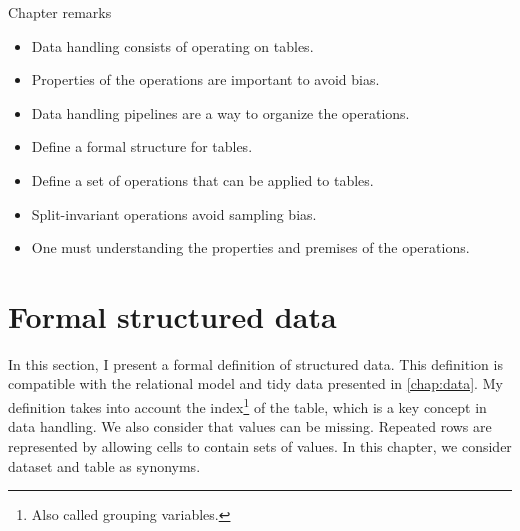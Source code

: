 \begin{mainbox}{Chapter remarks}


  \startcontents[chapters]
  \vspace{1em}


  \begin{itemize}
    \itemsep0em
    \item Data handling consists of operating on tables.
    \item Properties of the operations are important to avoid bias.
    \item Data handling pipelines are a way to organize the operations.
  \end{itemize}


  \begin{itemize}
    \itemsep0em
    \item Define a formal structure for tables.
    \item Define a set of operations that can be applied to tables.
  \end{itemize}


  \begin{itemize}
    \itemsep0em
    \item Split-invariant operations avoid sampling bias.
    \item One must understanding the properties and premises of the operations.
  \end{itemize}
\end{mainbox}

{}
\clearpage

\section{Formal structured data}

\newcommand{\domainof}[1]{\mathcal{D}\!\left(#1\right)}
\newcommand{\missing}{\text{?}}
\newcommand{\rowcard}[1][k_1, \dots, k_k]{\operatorname{card}\!\left(#1\right)}

In this section, I present a formal definition of structured data.  This definition is
compatible with the relational model and tidy data presented in \cref{chap:data}.
My definition takes into account the index\footnote{Also called grouping variables.} of
the table, which is a key concept in data handling.  We also consider that values can be
missing.  Repeated rows are represented by allowing cells to contain sets of values.
In this chapter, we consider dataset and table as synonyms.


